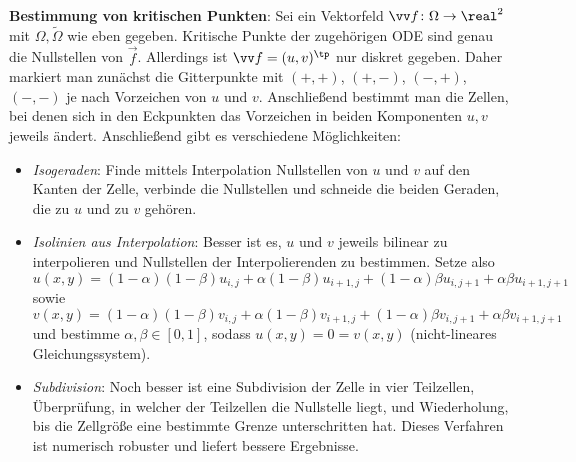 \textbf{Bestimmung von kritischen Punkten}:
Sei ein Vektorfeld $\vec{f}\colon \Omega \to \real^2$ mit $\Omega, \widetilde{\Omega}$ wie eben
gegeben.
Kritische Punkte der zugehörigen ODE sind genau die Nullstellen von $\vec{f}$.
Allerdings ist $\vec{f} = (u, v)^\tp$ nur diskret gegeben.
Daher markiert man zunächst die Gitterpunkte mit $(+,+)$, $(+,-)$, $(-,+)$, $(-,-)$ je nach
Vorzeichen von $u$ und $v$.
Anschließend bestimmt man die Zellen, bei denen sich in den Eckpunkten das Vorzeichen in
beiden Komponenten $u, v$ jeweils ändert.
Anschließend gibt es verschiedene Möglichkeiten:
\begin{itemize}
    \item
    \emph{Isogeraden}:
    Finde mittels Interpolation Nullstellen von $u$ und $v$ auf den Kanten der Zelle,
    verbinde die Nullstellen und schneide die beiden Geraden, die zu $u$ und zu $v$ gehören.
    
    \item
    \emph{Isolinien aus Interpolation}:
    Besser ist es, $u$ und $v$ jeweils bilinear zu interpolieren und
    Nullstellen der Interpolierenden zu bestimmen.
    Setze also\\
    $u(x, y) = (1-\alpha)(1-\beta) u_{i,j} + \alpha(1-\beta) u_{i+1,j} +
    (1-\alpha)\beta u_{i,j+1} + \alpha\beta u_{i+1,j+1}$ sowie\\
    $v(x, y) = (1-\alpha)(1-\beta) v_{i,j} + \alpha(1-\beta) v_{i+1,j} +
    (1-\alpha)\beta v_{i,j+1} + \alpha\beta v_{i+1,j+1}$ und
    bestimme $\alpha, \beta \in [0, 1]$, sodass $u(x, y) = 0 = v(x, y)$
    (nicht-lineares Gleichungssystem).
    
    \item
    \emph{Subdivision}:
    Noch besser ist eine Subdivision der Zelle in vier Teilzellen,
    Überprüfung, in welcher der Teilzellen die Nullstelle liegt, und Wiederholung,
    bis die Zellgröße eine bestimmte Grenze unterschritten hat.
    Dieses Verfahren ist numerisch robuster und liefert bessere Ergebnisse.
\end{itemize}

\linie

